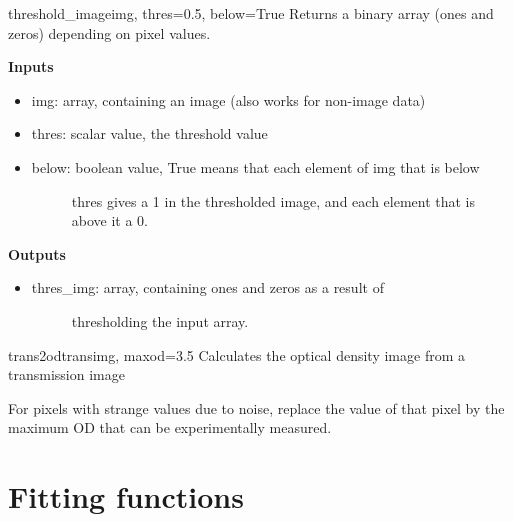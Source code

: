 \documentclass[letterpaper,10pt,english]{manual}
\begin{document}
\hypertarget{odysseus.imageprocess.threshold_image}{}\begin{funcdesc}{threshold\_image}{img, thres=0.5, below=True}
Returns a binary array (ones and zeros) depending on pixel values.

\textbf{Inputs}
\begin{itemize}
\item {} 
img: array, containing an image (also works for non-image data)

\item {} 
thres: scalar value, the threshold value

\item {} \begin{description}
\item[below: boolean value, True means that each element of img that is below] \leavevmode
thres gives a 1 in the thresholded image, and each element that
is above it a 0.

\end{description}

\end{itemize}

\textbf{Outputs}
\begin{itemize}
\item {} \begin{description}
\item[thres\_img: array, containing ones and zeros as a result of] \leavevmode
thresholding the input array.

\end{description}

\end{itemize}
\end{funcdesc}

\hypertarget{odysseus.imageprocess.trans2od}{}\begin{funcdesc}{trans2od}{transimg, maxod=3.5}
Calculates the optical density image from a transmission image

For pixels with strange values due to noise, replace the value of that pixel
by the maximum OD that can be experimentally measured.
\end{funcdesc}

\resetcurrentobjects
\hypertarget{--doc-fitfuncs}{}

\section{Fitting functions}
\end{document}
